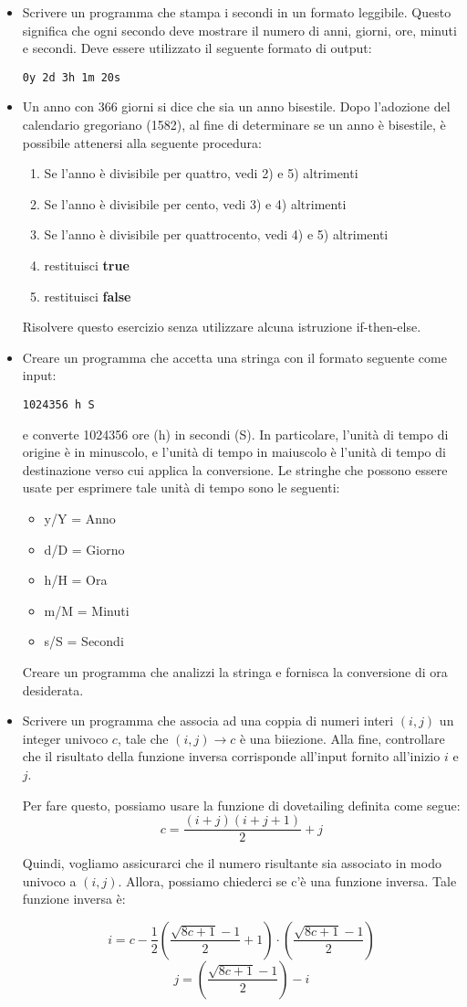 \documentclass[]{scrartcl}
\begin{document}
\begin{itemize}
\item Scrivere un programma che stampa i secondi in un formato leggibile. Questo significa che ogni secondo deve mostrare il numero di anni, giorni, ore, minuti e secondi. Deve essere utilizzato il seguente formato di output:
\begin{center}
\texttt{0y 2d 3h 1m 20s}
\end{center}
\item Un anno con 366 giorni si dice che sia un anno bisestile. Dopo l'adozione del calendario gregoriano (1582), al fine di determinare se un anno è bisestile, è possibile attenersi alla seguente procedura:
\begin{enumerate}
\item Se l'anno è divisibile per quattro, vedi 2) e 5) altrimenti
\item Se l'anno è divisibile per cento, vedi 3) e 4) altrimenti
\item Se l'anno è divisibile per quattrocento, vedi 4) e 5) altrimenti
\item restituisci \textbf{true}
\item restituisci \textbf{false}
\end{enumerate}
Risolvere questo esercizio senza utilizzare alcuna istruzione if-then-else.

\item Creare un programma che accetta una stringa con il formato seguente come input:
\begin{center}
	\texttt{1024356 h S}
\end{center}
e converte 1024356 ore (h) in secondi (S). In particolare, l'unità di tempo di origine è in minuscolo, e l'unità di tempo in maiuscolo è l'unità di tempo di destinazione verso cui applica la conversione. Le stringhe che possono essere usate per esprimere tale unità di tempo sono le seguenti:
\begin{itemize}
\item y/Y = Anno
\item d/D = Giorno
\item  h/H = Ora
\item  m/M = Minuti
\item  s/S = Secondi
\end{itemize}
Creare un programma che analizzi la stringa e fornisca la conversione di ora desiderata.

\item  Scrivere un programma che associa ad una coppia di numeri interi $(i, j)$ un integer univoco 
$c$, tale che $(i,j)\to c$ è una biiezione. Alla fine, controllare che il risultato della funzione inversa corrisponde all'input fornito all'inizio $i$ e $j$.

Per fare questo, possiamo usare la funzione di dovetailing definita come segue:
\[c = \frac{(i+j)(i+j+1)}{2} + j\]

Quindi, vogliamo assicurarci che il numero risultante sia associato in modo univoco a $ (i, j) $. Allora, possiamo chiederci se c'è una funzione inversa. Tale funzione inversa è:

\[i = c - \frac{1}{2}\left(\frac{\sqrt{8c+1}-1}{2} + 1\right) \cdot\left(\frac{\sqrt{8c+1}-1}{2}\right)\]
\[j = \left(\frac{\sqrt{8c+1}-1}{2}\right)-i\]
\end{itemize}
\end{document}
